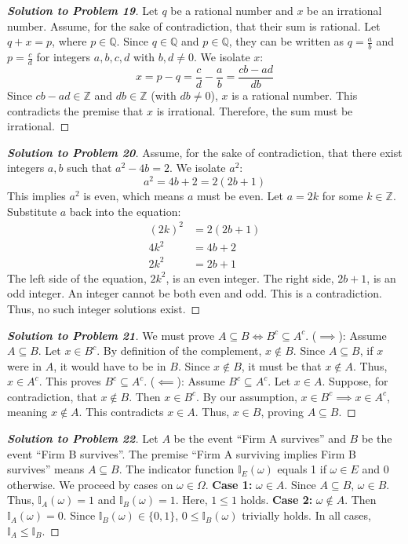 \documentclass[11pt]{article}
\begin{document}
\begin{proof}[\textbf{Solution to Problem 19}]
Let $q$ be a rational number and $x$ be an irrational number. Assume, for the sake of contradiction, that their sum is rational. Let $q + x = p$, where $p \in \mathbb{Q}$.
Since $q \in \mathbb{Q}$ and $p \in \mathbb{Q}$, they can be written as $q = \frac{a}{b}$ and $p = \frac{c}{d}$ for integers $a,b,c,d$ with $b,d \neq 0$.
We isolate $x$:
\[ x = p - q = \frac{c}{d} - \frac{a}{b} = \frac{cb - ad}{db} \]
Since $cb - ad \in \mathbb{Z}$ and $db \in \mathbb{Z}$ (with $db \neq 0$), $x$ is a rational number. This contradicts the premise that $x$ is irrational. Therefore, the sum must be irrational.
\end{proof}

\begin{proof}[\textbf{Solution to Problem 20}]
Assume, for the sake of contradiction, that there exist integers $a, b$ such that $a^2 - 4b = 2$.
We isolate $a^2$:
\[ a^2 = 4b + 2 = 2(2b + 1) \]
This implies $a^2$ is even, which means $a$ must be even. Let $a = 2k$ for some $k \in \mathbb{Z}$.
Substitute $a$ back into the equation:
\begin{align*}
(2k)^2 &= 2(2b + 1) \\
4k^2 &= 4b + 2 \\
2k^2 &= 2b + 1
\end{align*}
The left side of the equation, $2k^2$, is an even integer. The right side, $2b + 1$, is an odd integer. An integer cannot be both even and odd. This is a contradiction. Thus, no such integer solutions exist.
\end{proof}

\begin{proof}[\textbf{Solution to Problem 21}]
We must prove $A \subseteq B \iff B^c \subseteq A^c$.
($\implies$): Assume $A \subseteq B$. Let $x \in B^c$. By definition of the complement, $x \notin B$. Since $A \subseteq B$, if $x$ were in $A$, it would have to be in $B$. Since $x \notin B$, it must be that $x \notin A$. Thus, $x \in A^c$. This proves $B^c \subseteq A^c$.
($\impliedby$): Assume $B^c \subseteq A^c$. Let $x \in A$. Suppose, for contradiction, that $x \notin B$. Then $x \in B^c$. By our assumption, $x \in B^c \implies x \in A^c$, meaning $x \notin A$. This contradicts $x \in A$. Thus, $x \in B$, proving $A \subseteq B$.
\end{proof}

\begin{proof}[\textbf{Solution to Problem 22}]
Let $A$ be the event ``Firm A survives'' and $B$ be the event ``Firm B survives''. The premise ``Firm A surviving implies Firm B survives'' means $A \subseteq B$.
The indicator function $\mathbb{I}_E(\omega)$ equals 1 if $\omega \in E$ and 0 otherwise.
We proceed by cases on $\omega \in \Omega$.
\textbf{Case 1:} $\omega \in A$. Since $A \subseteq B$, $\omega \in B$. Thus, $\mathbb{I}_A(\omega) = 1$ and $\mathbb{I}_B(\omega) = 1$. Here, $1 \le 1$ holds.
\textbf{Case 2:} $\omega \notin A$. Then $\mathbb{I}_A(\omega) = 0$. Since $\mathbb{I}_B(\omega) \in \{0, 1\}$, $0 \le \mathbb{I}_B(\omega)$ trivially holds.
In all cases, $\mathbb{I}_A \le \mathbb{I}_B$.
\end{proof}
\end{document}
